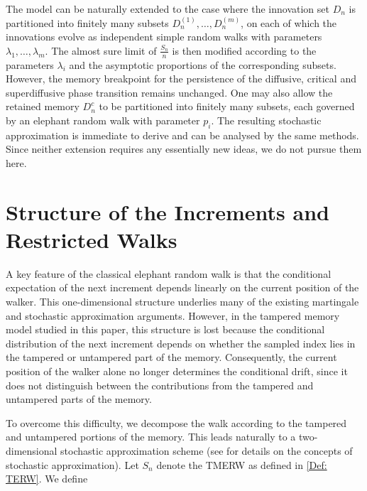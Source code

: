 \documentclass{article}
\numberwithin{equation}{section}
\newcommand{\1}{\mathbf{1}}
\newcommand{\0}{\mathbf{0}}
\begin{document}
The model can be naturally extended to the case where the innovation set $D_n$ is partitioned into finitely many subsets $D_n^{(1)},\ldots,D_n^{(m)}$, on each of which the innovations evolve as independent simple random walks with parameters $\lambda_1,\ldots,\lambda_m$. The almost sure limit of $\frac{S_n}{n}$ is then modified according to the parameters $\lambda_i$ and the asymptotic proportions of the corresponding subsets. However, the memory breakpoint for the persistence of the diffusive, critical and superdiffusive phase transition remains unchanged. One may also allow the retained memory $D_n^c$ to be partitioned into finitely many subsets, each governed by an elephant random walk with parameter $p_i$. The resulting stochastic approximation is immediate to derive and can be analysed by the same methods. Since neither extension requires any essentially new ideas, we do not pursue them here.

\section{Structure of the Increments and Restricted Walks}
\label{Sec: techniques}
A key feature of the classical elephant random walk is that the conditional expectation of the next increment depends linearly on the current position of the walker. This one-dimensional structure underlies many of the existing martingale and stochastic approximation arguments. However, in the tampered memory model studied in this paper, this structure is lost because the conditional distribution of the next increment depends on whether the sampled index lies in the tampered or untampered part of the memory. Consequently, the current position of the walker alone no longer determines the conditional drift, since it does not distinguish between the contributions from the tampered and untampered parts of the memory.

To overcome this difficulty, we decompose the walk according to the tampered and untampered portions of the memory. This leads naturally to a two-dimensional stochastic approximation scheme (see \cite{Borkar, Zh_2016} for details on the concepts of stochastic approximation). Let $S_n$ denote the TMERW as defined in \eqref{Def: TERW}. We define  
\end{document}

